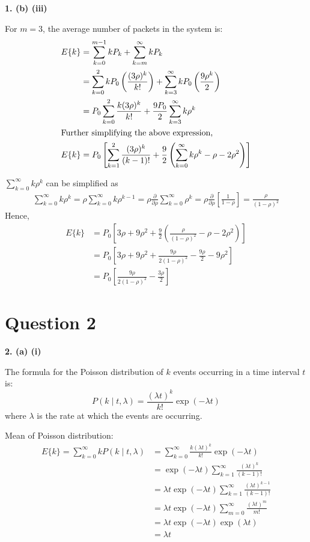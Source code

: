\documentclass[12pt, a4paper]{article}
\begin{document}
\vspace{1cm}
\noindent \textbf{1. (b) (iii)}

\noindent For \(m = 3\), the average number of packets in the system is:
\begin{align*}
  E\{k\} &= \sum_{k=0}^{m-1} kP_k + \sum_{k=m}^{\infty} kP_k \\
  &= \sum_{k=0}^{2} kP_0\left(\frac{(3\rho)^k}{k!}\right) + \sum_{k=3}^{\infty} kP_0 \left(\frac{9\rho^k}{2}\right) \\
  &= P_0\sum_{k=0}^{2} \frac{k(3\rho)^k}{k!} + \frac{9P_0}{2}\sum_{k=3}^{\infty} k\rho^k \\
\intertext{Further simplifying the above expression,}
  E\{k\} &= P_0 \left[\sum_{k=1}^{2} \frac{(3\rho)^k}{(k-1)!} + \frac{9}{2}\left(\sum_{k=0}^{\infty} k\rho^k - \rho - 2\rho^2\right) \right]
\end{align*}

\noindent\(\sum_{k=0}^{\infty} k\rho^k\) can be simplified as
\begin{align*}
  \sum_{k=0}^{\infty} k\rho^k = \rho\sum_{k=0}^{\infty} k\rho^{k-1} = \rho\frac{\partial}{\partial\rho}\sum_{k=0}^{\infty} \rho^k = \rho\frac{\partial}{\partial\rho}\left[\frac{1}{1-\rho}\right] = \frac{\rho}{(1-\rho)^2}
\end{align*}
Hence,
\begin{align*}
  E\{k\} &= P_0 \left[3\rho + 9\rho^2 + \frac{9}{2}\left(\frac{\rho}{(1-\rho)^2} - \rho - 2\rho^2\right) \right] \\
  &= P_0 \left[3\rho + 9\rho^2 + \frac{9\rho}{2(1-\rho)^2} - \frac{9\rho}{2} - 9\rho^2 \right] \\
  &= P_0 \left[\frac{9\rho}{2(1-\rho)^2} - \frac{3\rho}{2}\right]
\end{align*}

\newpage
\section*{Question 2}
\textbf{2. (a) (i)}

\noindent The formula for the Poisson distribution of \(k\) events occurring in a time interval \(t\) is:
\[
  P(k \mid t,\lambda) = \frac{(\lambda t)^k}{k!}\exp{(-\lambda t)}
\]
where \(\lambda\) is the rate at which the events are occurring.

\vspace{0.5cm}
\noindent Mean of Poisson distribution:
\begin{align*}
  E\{k\} = \sum_{k=0}^{\infty} kP(k \mid t,\lambda) &= \sum_{k=0}^{\infty} \frac{k(\lambda t)^k}{k!} \exp{(-\lambda t)} \\
  &= \exp{(-\lambda t)} \sum_{k=1}^{\infty} \frac{(\lambda t)^k}{(k-1)!} \\
  &= \lambda t\exp{(-\lambda t)}\sum_{k=1}^{\infty} \frac{(\lambda t)^{k-1}}{(k-1)!} \\
  &= \lambda t\exp{(-\lambda t)}\sum_{m=0}^{\infty} \frac{(\lambda t)^m}{m!} \\
  &= \lambda t\exp{(-\lambda t)}\exp{(\lambda t)} \\
  &= \lambda t
\end{align*}
\end{document}
